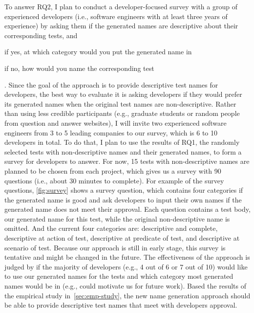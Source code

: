To answer RQ2, I plan to conduct a developer-focused survey with a group of experienced developers (i.e., software engineers with at least three years of experience) by asking them if the generated names are descriptive about their corresponding tests, and
\begin{enumerate*}
    \item if yes, at which category would you put the generated name in
    \item if no, how would you name the corresponding test
\end{enumerate*}.
%
Since the goal of the approach is to provide descriptive test names for developers, the best way to evaluate it is asking developers if they would prefer its generated names when the original test names are non-descriptive.
%
Rather than using less credible participants (e.g., graduate students or random people from question and answer websites), I will invite two experienced software engineers from \num{3} to \num{5} leading companies to our survey, which is \num{6} to \num{10} developers in total.
%
To do that, I plan to use the results of RQ1, the randomly selected tests with non-descriptive names and their generated names, to form a survey for developers to answer.
%
For now, \num{15} tests with non-descriptive names are planned to be chosen from each project, which gives us a survey with \num{90} questions (i.e., about \num{30} minutes to complete).
%
For example of the survey questions, \cref{fig:survey} shows a survey question, which contains four categories if the generated name is good and ask developers to input their own names if the generated name does not meet their approval.
%
Each question contains a test body, our generated name for this test, while the original non-descriptive name is omitted.
%
And the current four categories are: descriptive and complete, descriptive at action of test, descriptive at predicate of test, and descriptive at scenario of test.
%
Because our approach is still in early stage, this survey is tentative and might be changed in the future.
%
The effectiveness of the approach is judged by if the majority of developers (e.g., \num{4} out of \num{6} or \num{7} out of \num{10}) would like to use our generated names for the tests and which category most generated names would be in (e.g., could motivate us for future work).
%
Based the results of the empirical study in~\cref{sec:emp-study}, the new name generation approach should be able to provide descriptive test names that meet with developers approval.


